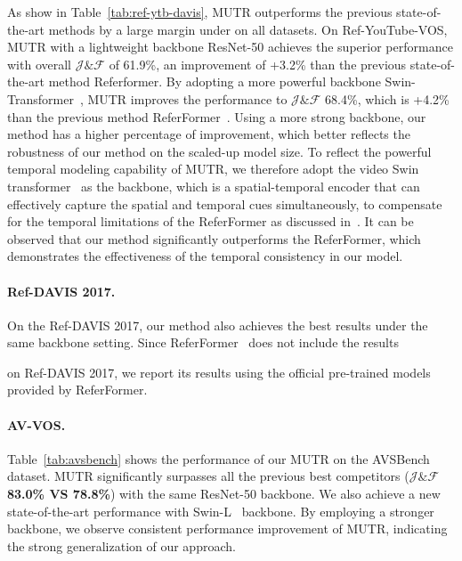 \documentclass{article}
\begin{document}
As show in Table~\ref{tab:ref-ytb-davis}, MUTR outperforms the previous state-of-the-art methods by a large margin under on all datasets. On Ref-YouTube-VOS, MUTR with a lightweight backbone ResNet-50 achieves the superior performance with overall $\mathcal{J}\&\mathcal{F}$ of 61.9\%, an improvement of +3.2\% than the previous state-of-the-art method Referformer. 
By adopting a more powerful backbone Swin-Transformer~\cite{liu2021swin}, MUTR improves the performance to $\mathcal{J}\&\mathcal{F}$ 68.4\%, which is +4.2\%  than the previous method ReferFormer~\cite{wu2022language}. Using a more strong backbone, our method has a higher percentage of improvement, which better reflects the robustness of our method on the scaled-up model size. 
To reflect the powerful temporal modeling capability of MUTR, we therefore adopt the video Swin transformer~\cite{liu2022video} as the backbone, which is a spatial-temporal encoder that can effectively capture the spatial and temporal cues simultaneously, to compensate for the temporal limitations of the ReferFormer as discussed in~\cite{hu20221st}. It can be observed that our method significantly outperforms the ReferFormer, which demonstrates the effectiveness of the temporal consistency in our model.


\paragraph{Ref-DAVIS 2017.} On the Ref-DAVIS 2017, our method also achieves the best results under the same backbone setting. Since ReferFormer~\cite{wu2022language} does not include the results

on Ref-DAVIS 2017, we report its results using the official pre-trained models provided by ReferFormer.

\paragraph{AV-VOS.} Table~\ref{tab:avsbench} shows the performance of our MUTR on the AVSBench dataset. MUTR significantly surpasses all the previous best competitors  ($\mathcal{J}\&\mathcal{F}$ \textbf{83.0\% VS 78.8\%}) with the same ResNet-50 backbone. We also achieve a new state-of-the-art performance with Swin-L~\cite{liu2021swin} backbone.
By employing a stronger backbone, we observe consistent performance improvement of MUTR, indicating the strong generalization of our approach.
\end{document}
